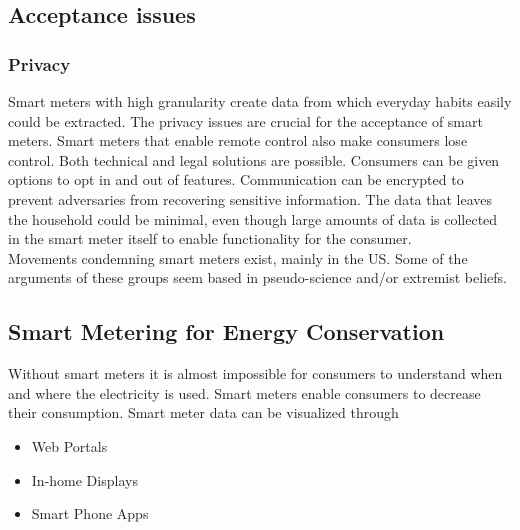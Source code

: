 \subsection{Acceptance issues}

\subsubsection{Privacy}
Smart meters with high granularity create data from which everyday habits easily could be extracted.
The privacy issues are crucial for the acceptance of smart meters.
Smart meters that enable remote control also make consumers lose control.
Both technical and legal solutions are possible.
Consumers can be given options to opt in and out of features.
Communication can be encrypted to prevent adversaries from recovering sensitive information.
The data that leaves the household could be minimal, even though large amounts of data is collected in the smart meter itself to enable functionality for the consumer.\\

Movements condemning smart meters exist, mainly in the US.
Some of the arguments of these groups seem based in pseudo-science and/or extremist beliefs.

\subsection{Smart Metering for Energy Conservation}
Without smart meters it is almost impossible for consumers to understand when and where the electricity is used. Smart meters enable consumers to decrease their consumption.
Smart meter data can be visualized through
\begin{itemize}
    \item Web Portals
    \item In-home Displays
    \item Smart Phone Apps
\end{itemize}

